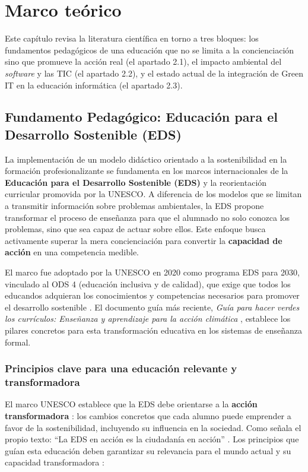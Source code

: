 \chapter{Marco teórico}
\label{cap:capitulo2}


Este capítulo revisa la literatura científica en torno a tres bloques: los fundamentos pedagógicos de una educación que no se limita a la concienciación sino que promueve la acción real (el apartado 2.1), el impacto ambiental del \textit{software} y las TIC (el apartado 2.2), y el estado actual de la integración de Green IT en la educación informática (el apartado 2.3).




\section{Fundamento Pedagógico: Educación para el Desarrollo Sostenible (EDS)}


La implementación de un modelo didáctico orientado a la sostenibilidad en la formación profesionalizante se fundamenta en los marcos internacionales de la \textbf{Educación para el Desarrollo Sostenible (EDS)} y la reorientación curricular promovida por la UNESCO. A diferencia de los modelos que se limitan a transmitir información sobre problemas ambientales, la EDS propone transformar el proceso de enseñanza para que el alumnado no solo conozca los problemas, sino que sea capaz de actuar sobre ellos. Este enfoque busca activamente superar la mera concienciación para convertir la \textbf{capacidad de acción} en una competencia medible.


El marco fue adoptado por la UNESCO en 2020 como programa EDS para 2030, vinculado al ODS 4 (educación inclusiva y de calidad), que exige que todos los educandos adquieran los conocimientos y competencias necesarios para promover el desarrollo sostenible \cite{unesco2020educacion}. El documento guía más reciente, \textit{Guía para hacer verdes los currículos: Enseñanza y aprendizaje para la acción climática} \cite{unesco2025guia}, establece los pilares concretos para esta transformación educativa en los sistemas de enseñanza formal.


\subsection{Principios clave para una educación relevante y transformadora}


El marco UNESCO establece que la EDS debe orientarse a la \textbf{acción transformadora} \cite{unesco2020educacion}: los cambios concretos que cada alumno puede emprender a favor de la sostenibilidad, incluyendo su influencia en la sociedad. Como señala el propio texto: ``La EDS en acción es la ciudadanía en acción'' \cite{unesco2020educacion}. Los principios que guían esta educación deben garantizar su relevancia para el mundo actual y su capacidad transformadora \cite{unesco2025guia}:


